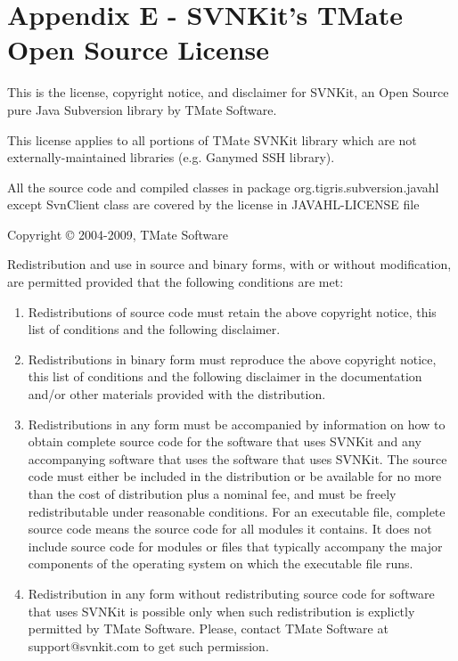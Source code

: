 \chapter*{Appendix E - SVNKit's TMate Open Source License}
\noindent This is the license, copyright notice, and disclaimer for SVNKit, an
Open Source pure Java Subversion library by TMate Software.

\bigskip
\noindent This license applies to all portions of TMate SVNKit library which 
are not externally-maintained libraries (e.g. Ganymed SSH library).

\bigskip
\noindent All the source code and compiled classes in package org.tigris.subversion.javahl
except SvnClient class are covered by the license in JAVAHL-LICENSE file

\bigskip
\noindent Copyright © 2004-2009, TMate Software

\bigskip
\noindent Redistribution and use in source and binary forms, with or without modification, 
are permitted provided that the following conditions are met:

\begin{enumerate}
  \item      Redistributions of source code must retain the above copyright notice, 
      this list of conditions and the following disclaimer.
      
    \item Redistributions in binary form must reproduce the above copyright notice, 
      this list of conditions and the following disclaimer in the documentation 
      and/or other materials provided with the distribution.
      
    \item Redistributions in any form must be accompanied by information on how to 
      obtain complete source code for the software that uses SVNKit and any 
      accompanying software that uses the software that uses SVNKit. The source 
      code must either be included in the distribution or be available for no 
      more than the cost of distribution plus a nominal fee, and must be freely 
      redistributable under reasonable conditions. For an executable file, complete 
      source code means the source code for all modules it contains. It does not 
      include source code for modules or files that typically accompany the major 
      components of the operating system on which the executable file runs.
      
    \item Redistribution in any form without redistributing source code for software 
      that uses SVNKit is possible only when such redistribution is explictly permitted 
      by TMate Software. Please, contact TMate Software at support@svnkit.com to 
      get such permission.
\end{enumerate}

